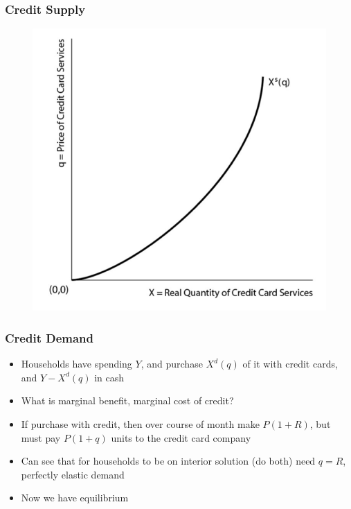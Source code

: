 \documentclass{beamer}
\begin{document}
\begin{frame}
\frametitle[alignment=center]{Credit Supply}
\begin{figure}
\centering
\includegraphics[scale=0.65]{Figures/W_Fig_12pt3.png}
\end{figure}
\end{frame}

\begin{frame}
\frametitle[alignment=center]{Credit Demand}
\begin{itemize}
\item Households have spending $Y$, and purchase $X^d(q)$ of it with credit cards, and $Y-X^d(q)$ in cash
\bigskip
\item What is marginal benefit, marginal cost of credit?
\bigskip
\item If purchase with credit, then over course of month make $P(1+R)$, but must pay $P(1+q)$ units to the credit card company
\bigskip
\item Can see that for households to be on interior solution (do both) need $q=R$, perfectly elastic demand
\bigskip
\item Now we have equilibrium
\end{itemize}
\end{frame}
\end{document}
